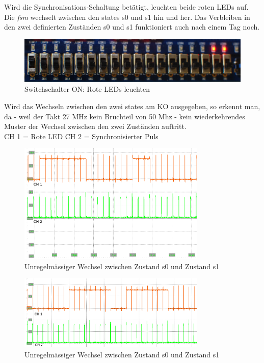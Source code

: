 Wird die Synchronisations-Schaltung betätigt, leuchten beide roten LEDs auf. Die \textit{fsm} wechselt zwischen den states s0 und s1 hin und her. Das Verbleiben in den zwei definierten Zuständen s0 und s1 funktioniert auch nach einem Tag noch. \\

\begin{figure}[H]
	\centering
	\includegraphics[width=1\textwidth]{images/metastability/synchronized.JPG}
	\caption{Switchschalter ON: Rote LEDs leuchten}
	\label{fig.metastabil.Ergebnis_BoardSynchron}
\end{figure}

\newpage
Wird das Wechseln zwischen den zwei states am KO ausgegeben, so erkennt man, da - weil der Takt 27 MHz kein Bruchteil von 50 Mhz - kein wiederkehrendes Muster der Wechsel zwischen den zwei Zuständen auftritt. \\
CH 1 = Rote LED
CH 2 = Synchronisierter Puls\\

\begin{figure}[H]
	\centering
	\includegraphics[width=0.8\textwidth]{images/metastability/synchron_eng_2.png}
	\caption{Unregelmässiger Wechsel zwischen Zustand s0 und Zustand s1}
	\label{fig.metastabil.Ergebnis_1}
\end{figure}

\begin{figure}[H]
	\centering
	\includegraphics[width=0.8\textwidth]{images/metastability/synchron_eng_3.png}
	\caption{Unregelmässiger Wechsel zwischen Zustand s0 und Zustand s1}
	\label{fig.metastabil.Ergebnis_2}
\end{figure}

